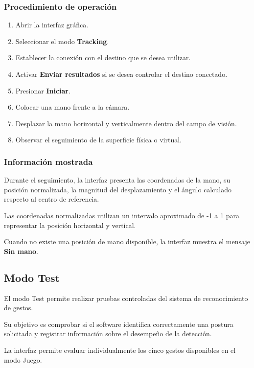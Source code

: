 \documentclass[letterpaper,journal]{IEEEtran}
\begin{document}
\subsubsection{Procedimiento de operación}

\begin{enumerate}
    \item Abrir la interfaz gráfica.
    \item Seleccionar el modo \textbf{Tracking}.
    \item Establecer la conexión con el destino
    que se desea utilizar.
    \item Activar \textbf{Enviar resultados}
    si se desea controlar el destino conectado.
    \item Presionar \textbf{Iniciar}.
    \item Colocar una mano frente a la cámara.
    \item Desplazar la mano horizontal y
    verticalmente dentro del campo de visión.
    \item Observar el seguimiento de la
    superficie física o virtual.
\end{enumerate}

\subsubsection{Información mostrada}

Durante el seguimiento, la interfaz presenta
las coordenadas de la mano, su posición
normalizada, la magnitud del desplazamiento
y el ángulo calculado respecto al centro
de referencia.

Las coordenadas normalizadas utilizan un
intervalo aproximado de -1 a 1 para representar
la posición horizontal y vertical.

Cuando no existe una posición de mano disponible,
la interfaz muestra el mensaje
\textbf{Sin mano}.

\subsection{Modo Test}

El modo Test permite realizar pruebas controladas
del sistema de reconocimiento de gestos.

Su objetivo es comprobar si el software identifica
correctamente una postura solicitada y registrar
información sobre el desempeño de la detección.

La interfaz permite evaluar individualmente los
cinco gestos disponibles en el modo Juego.
\end{document}
